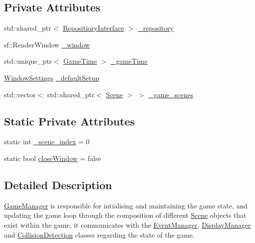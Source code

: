 \subsection*{Private Attributes}
\begin{DoxyCompactItemize}
\item 
std\+::shared\+\_\+ptr$<$ \hyperlink{class_repositiory_interface}{Repositiory\+Interface} $>$ \hyperlink{class_game_manager_adf8ffad3969c2bee2332eb3ea58a3c9c}{\+\_\+repository}
\item 
sf\+::\+Render\+Window \hyperlink{class_game_manager_a0c91609e7557e4e97a0e4be541254a38}{\+\_\+window}
\item 
std\+::unique\+\_\+ptr$<$ \hyperlink{class_game_time}{Game\+Time} $>$ \hyperlink{class_game_manager_ae08fe7df616e789e4858645b56d9b73b}{\+\_\+game\+Time}
\item 
\hyperlink{struct_window_settings}{Window\+Settings} \hyperlink{class_game_manager_a06843f28cb1609e41da7eee19be9aa87}{\+\_\+default\+Setup}
\item 
std\+::vector$<$ std\+::shared\+\_\+ptr$<$ \hyperlink{class_scene}{Scene} $>$ $>$ \hyperlink{class_game_manager_a6be6c6b38c1b95d7fd84819eba50e618}{\+\_\+game\+\_\+scenes}
\end{DoxyCompactItemize}
\subsection*{Static Private Attributes}
\begin{DoxyCompactItemize}
\item 
static int \hyperlink{class_game_manager_aedb575ca538853f3d7053b33bef238e0}{\+\_\+scene\+\_\+index} = 0
\item 
static bool \hyperlink{class_game_manager_a07c75a9507a0d82f88a0b62d808fcf3c}{close\+Window} = false
\end{DoxyCompactItemize}


\subsection{Detailed Description}
\hyperlink{class_game_manager}{Game\+Manager} is responsible for intialising and maintaining the game state, and updating the game loop through the composition of different \hyperlink{class_scene}{Scene} objects that exist within the game, it communicates with the \hyperlink{class_event_manager}{Event\+Manager}, \hyperlink{class_display_manager}{Display\+Manager} and \hyperlink{class_collision_detection}{Collision\+Detection} classes regarding the state of the game. 


